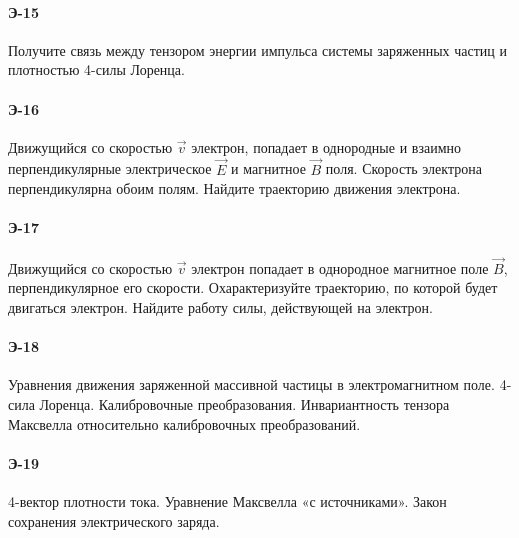 \paragraph{Э-15}
Получите связь между тензором энергии импульса системы заряженных частиц и плотностью 4-силы Лоренца.

\paragraph{Э-16}
Движущийся со скоростью $\vec v$ электрон, попадает в однородные и взаимно перпендикулярные электрическое $\vec E$ и магнитное $\vec B$ поля. Скорость электрона перпендикулярна обоим полям. Найдите траекторию движения электрона.

\paragraph{Э-17}
Движущийся со скоростью $\vec v$ электрон попадает в однородное магнитное поле $\vec B$, перпендикулярное его скорости. Охарактеризуйте траекторию, по которой будет двигаться электрон. Найдите работу силы, действующей на электрон.

\paragraph{Э-18}
Уравнения движения заряженной массивной частицы в электромагнитном поле. 4-сила Лоренца. Калибровочные преобразования. Инвариантность тензора Максвелла относительно калибровочных преобразований.

\paragraph{Э-19}
4-вектор плотности тока. Уравнение Максвелла «с источниками». Закон сохранения электрического заряда.


